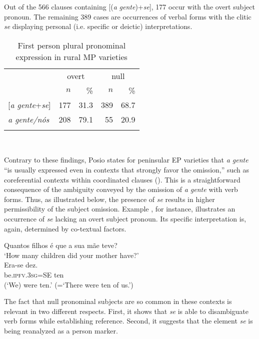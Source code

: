 \documentclass[output=paper]{langscibook}
\begin{document}
Out of the 566 clauses containing [(\textit{a} \textit{gente})+\textit{se}], 177 occur with the overt subject pronoun. The remaining 389 cases are occurrences of  verbal forms with the clitic \textit{se} displaying personal (i.e. specific or deictic) interpretations.

\begin{table}
\begin{tabular}{l rrrr}
\lsptoprule
~ & \multicolumn{2}{c}{overt} & \multicolumn{2}{c}{null}\\\cmidrule(lr){2-3}\cmidrule(lr){4-5}
  & $n$ & \% & $n$ & \%\\\midrule
{[\textit{a gente}+\textit{se}]} & 177 & 31.3 & 389 & 68.7\\
\textit{a gente/nós} & 208 & 79.1 & 55 & 20.9\\
\lspbottomrule
\end{tabular}\\
\caption{First person plural pronominal expression in rural MP varieties}
\label{tab:henriques:3}
\end{table}

Contrary to these findings, Posio states for peninsular EP varieties that \textit{a gente} “is usually expressed even in contexts that strongly favor the omission,” such as coreferential contexts within coordinated clauses (\citeyear[345]{Posio2012}). This is a straightforward consequence of the ambiguity conveyed by the omission of \textit{a gente} with  verb forms. Thus, as illustrated below, the presence of \textit{se} results in higher permissibility of the  subject omission. Example , for instance, illustrates an occurrence of \textit{se} lacking an overt subject pronoun. Its specific interpretation is, again, determined by co-textual factors.

\ea \begin{xlist}
  Quantos filhos é que a sua mãe teve? \label{ex:henriques:27}\\
 \glt `How many children did your mother have?'\\
  \gll Era-se dez.\\
         be.\textsc{ipfv.3sg}=SE ten\\
 \glt (`We) were ten.' (=`There were ten of us.')
 \end{xlist}
\z

The fact that null pronominal subjects are so common in these contexts is relevant in two different respects. First, it shows that \textit{se} is able to disambiguate  verb forms while establishing  reference. Second, it suggests that the element \textit{se} is being reanalyzed as a  person marker.
\end{document}
